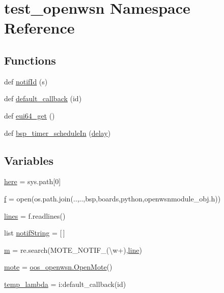 \hypertarget{namespacetest__openwsn}{}\section{test\+\_\+openwsn Namespace Reference}
\label{namespacetest__openwsn}
\subsection*{Functions}
\begin{DoxyCompactItemize}
\item 
def \hyperlink{namespacetest__openwsn_a60d43349dad4dffe394a0fff23bcccdc}{notif\+Id} (s)
\item 
def \hyperlink{namespacetest__openwsn_af27a6882876339d2aeea359a5ace5947}{default\+\_\+callback} (id)
\item 
def \hyperlink{namespacetest__openwsn_af3d1a7f647d1e80323baea725a2f749e}{eui64\+\_\+get} ()
\item 
def \hyperlink{namespacetest__openwsn_a485c1fe4d1c84079c5afc8ea19f67acc}{bsp\+\_\+timer\+\_\+schedule\+In} (\hyperlink{chips_2cc1101_2radio_8c_ac64d140b48f8d336f899452fae7cfe00}{delay})
\end{DoxyCompactItemize}
\subsection*{Variables}
\begin{DoxyCompactItemize}
\item 
\hyperlink{namespacetest__openwsn_a241e3675ed16b73f3b4fcf3573f7e54b}{here} = sys.\+path\mbox{[}0\mbox{]}
\item 
\hyperlink{namespacetest__openwsn_a7dbf3c68588e5fbe32e0be28d88af877}{f} = open(os.\+path.\+join(\textquotesingle{}..\textquotesingle{},\textquotesingle{}..\textquotesingle{},\textquotesingle{}bsp\textquotesingle{},\textquotesingle{}boards\textquotesingle{},\textquotesingle{}python\textquotesingle{},\textquotesingle{}openwsnmodule\+\_\+obj.\+h\textquotesingle{}))
\item 
\hyperlink{namespacetest__openwsn_ad8c8bd6c5d990378eddab44bd10fadb5}{lines} = f.\+readlines()
\item 
list \hyperlink{namespacetest__openwsn_ae328fb1c7b53ef9b3cf133b925b839e7}{notif\+String} = \mbox{[}$\,$\mbox{]}
\item 
\hyperlink{namespacetest__openwsn_a42e7b74b0935e2b177bcafbb70953694}{m} = re.\+search(\textquotesingle{}M\+O\+T\+E\+\_\+\+N\+O\+T\+I\+F\+\_\+(\textbackslash{}w+)\textquotesingle{},\hyperlink{_loader_8c_a2ee6c94e2795e459bcda34d6dfd04be6}{line})
\item 
\hyperlink{namespacetest__openwsn_a6c13977c553268fe64fbcaa394bf20e3}{mote} = \hyperlink{supply__obj_8h_a049e7d99ad67d618dbc1aa6bd2e72982}{oos\+\_\+openwsn.\+Open\+Mote}()
\item 
\hyperlink{namespacetest__openwsn_a109eefda679b7feab04bd321b1bdf241}{temp\+\_\+lambda} = i\+:default\+\_\+callback(id)
\end{DoxyCompactItemize}


